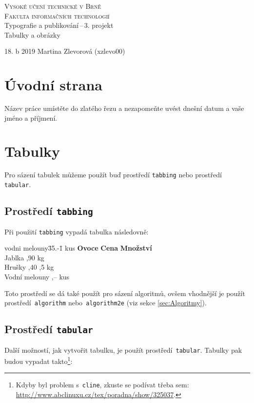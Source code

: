\documentclass[11pt, a4paper]{article}
\begin{document}
\begin{titlepage}
\begin{center}
\textsc{{\Huge Vysoké učení technické v Brně\\}
        {\huge Fakulta informačních technologií\\}}
{\LARGE Typografie a publikování\,--\,3. projekt\\}
{\Huge Tabulky a obrázky\\}
\end{center}
\lineskip=1pt
{\large 18. b 2019 \hfill Martina Zlevorová (xzlevo00)}
\end{titlepage}

\section{Úvodní strana}
Název práce umístěte do zlatého řezu a nezapomeňte uvést dnešní datum a vaše jméno a příjmení.

\section{Tabulky}
Pro sázení tabulek můžeme použít buď prostředí \texttt{tabbing} nebo prostředí \texttt{tabular}.
\subsection{Prostředí \texttt{tabbing}}
Při použití \texttt{tabbing} vypadá tabulka následovně:
\begin{tabbing}
vodni melouny\quad \= 35.-\qquad \= 1 kus\kill
\textbf{Ovoce} \> \textbf{Cena} \> \textbf{Množství} \\
Jablka ,90  kg \\
Hrušky ,40 ,5 kg \\
Vodní melouny ,--  kus \\
\end{tabbing}
Toto prostředí se dá také použít pro sázení algoritmů, ovšem vhodnější je použít prostředí\texttt{ algorithm} nebo\texttt{ algorithm2e} (viz sekce \ref{sec:Algoritmy}).
\subsection{Prostředí \texttt{tabular}}
Další možností, jak vytvořit tabulku, je použít prostředí\texttt{ tabular}. Tabulky pak budou vypadat takto\footnote{Kdyby byl problem s\texttt{ cline}, zkuste se podívat třeba sem: \href{http://www.abclinuxu.cz/tex/poradna/show/325037}{http://www.abclinuxu.cz/tex/poradna/show/325037}.
}:
\end{document}
